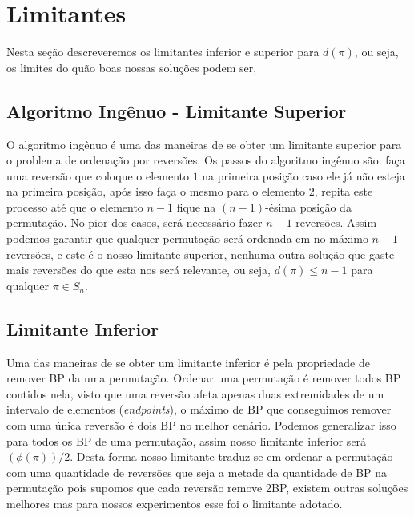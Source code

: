 \section{Limitantes}
Nesta seção descreveremos os limitantes inferior e superior para $d(\pi)$, ou seja, os limites do quão boas nossas soluções podem ser,

\subsection{Algoritmo Ingênuo -  Limitante Superior}
\label{algoritmo_ingenuo}
O algoritmo ingênuo é uma das maneiras de se obter um limitante superior para o problema de ordenação por reversões. Os passos do algoritmo ingênuo são: faça uma reversão que coloque o elemento $1$ na primeira posição caso ele já não esteja na primeira posição, após isso faça o mesmo para o elemento $2$, repita este processo até que o elemento $n-1$ fique na $(n-1)$-ésima posição da permutação. No pior dos casos, será necessário fazer $n - 1$ reversões. Assim podemos garantir que qualquer permutação será ordenada em no máximo $n - 1$ reversões, e este é o nosso limitante superior, nenhuma outra solução que gaste mais reversões do que esta nos será relevante, ou seja, $d(\pi) \leq n-1$ para qualquer $\pi \in S_n$.


\subsection{Limitante Inferior}
\label{limitante inferior}
Uma das maneiras de se obter um limitante inferior é pela propriedade de remover BP da uma permutação. Ordenar uma permutação é remover todos BP contidos nela, visto que uma reversão afeta apenas duas extremidades de um intervalo de elementos (\textit{endpoints}), o máximo de BP que conseguimos remover com uma única reversão é dois BP no melhor cenário. Podemos generalizar isso para todos os BP de uma permutação, assim nosso limitante inferior será $(\phi(\pi))/2$. Desta forma nosso limitante traduz-se em ordenar a permutação com uma quantidade de reversões que seja a metade da quantidade de BP na permutação pois supomos que cada reversão remove 2BP, existem outras soluções melhores mas para nossos experimentos esse foi o limitante adotado.


